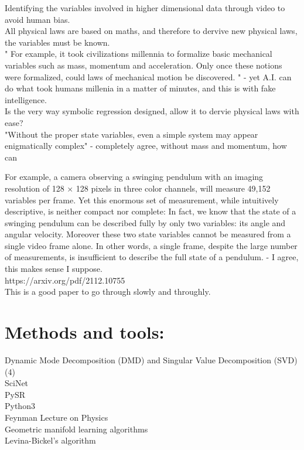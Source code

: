 \documentclass [12pt]{article}
\begin{document}
Identifying the variables involved in higher dimensional data through video to avoid human bias.\\ 

All physical laws are based on maths, and therefore to dervive new physical laws, the variables must be known.\\ 

"
For example, it took civilizations millennia to formalize basic mechanical variables such
as mass, momentum and acceleration. Only once these notions were formalized, could laws
of mechanical motion be discovered. " - yet A.I. can do what took humans millenia in a matter of minutes, and this is with fake intelligence.\\ 


Is the very way symbolic regression designed, allow it to dervie physical laws with ease? \\ 


"Without the proper state variables, even a simple system may appear enigmatically complex"  - completely agree, without mass and momentum, how can 

For example, a camera observing a swinging pendulum with an imaging resolution of 128 ×
128 pixels in three color channels, will measure 49,152 variables per frame. Yet this enormous
set of measurement, while intuitively descriptive, is neither compact nor complete: In fact, we
know that the state of a swinging pendulum can be described fully by only two variables: its
angle and angular velocity. Moreover these two state variables cannot be measured from a single
video frame alone. In other words, a single frame, despite the large number of measurements,
is insufficient to describe the full state of a pendulum. - I agree, this makes sense I suppose.\\ 


https://arxiv.org/pdf/2112.10755\\ 

This is a good paper to go through slowly and throughly.\\ 











\section{Methods and tools: }
Dynamic
Mode Decomposition (DMD) and Singular Value Decomposition (SVD) (4)\\
SciNet\\
PySR\\
Python3\\
 Feynman Lecture on Physics\\
Geometric manifold learning algorithms\\
 Levina-Bickel’s algorithm \\
\end{document}
